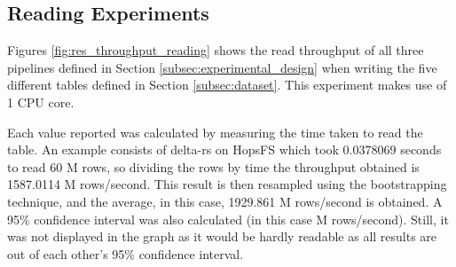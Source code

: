 \subsection{Reading Experiments}

Figures \ref{fig:res_throughput_reading} shows the read throughput of all three pipelines defined in Section \ref{subsec:experimental_design} when writing the five different tables defined in Section \ref{subsec:dataset}. This experiment makes use of 1 \gls{CPU} core. 

Each value reported was calculated by measuring the time taken to read the table. An example consists of delta-rs on \gls{HopsFS} which took 0.0378069 seconds to read 60 M rows, so dividing the rows by time the throughput obtained is 1587.0114 M rows/second. This result is then resampled using the bootstrapping technique, and the average, in this case, 1929.861 M rows/second is obtained. A 95\% confidence interval was also calculated (in this case  M rows/second). Still, it was not displayed in the graph as it would be hardly readable as all results are out of each other's 95\% confidence interval.

